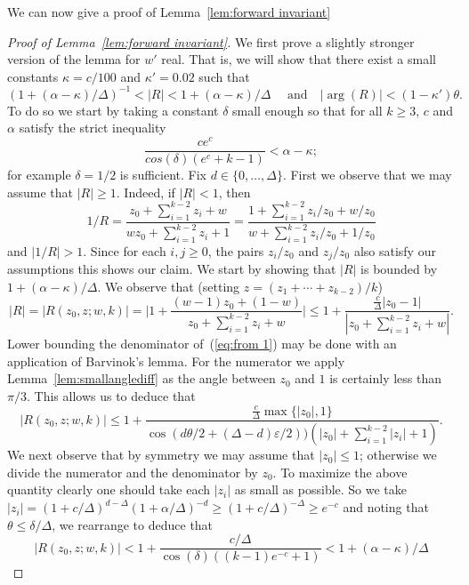 \documentclass[10pt,a4paper]{article}
\theoremstyle{definition}
\newcommand*{\eps}{\varepsilon}
\begin{document}
\noindent
We can now give a proof of Lemma~\ref{lem:forward invariant}
%
\begin{proof}[Proof of Lemma~\ref{lem:forward invariant}]
We first prove a slightly stronger version of the lemma for $w'$ real.
That is, we will show that there exist a small constants $\kappa = c/100$ and $\kappa'=0.02$ such that
\begin{equation}\label{eq:real case}
(1+(\alpha-\kappa)/\Delta)^{-1}<|R|<1+(\alpha-\kappa)/\Delta \quad \text{ and}\quad |\arg(R)|< (1-\kappa')\theta.
\end{equation}
To do so we start by taking a constant $\delta$ small enough so that for all $k \geq 3$, $c$ and $\alpha$ satisfy the strict inequality 
%
\begin{equation}
 \frac{ce^c}{cos(\delta)(e^c+k-1)} < \alpha - \kappa; 
 \label{eq:calphabounds}
\end{equation}
for example $\delta = 1/2$ is sufficient.
%
%
%
Fix $d\in\{0,\ldots,\Delta\}$.
First we observe that we may assume that $|R|\geq 1$. 
Indeed, if $|R|<1$, then 
\[
1/R=\frac{z_0+\sum_{i=1}^{k-2}z_i+w}{wz_0+\sum_{i=1}^{k-2}z_i+1}=\frac{1+\sum_{i=1}^{k-2}z_i/z_0+w/z_0}{w+\sum_{i=1}^{k-2}z_i/z_0+1/z_0}
\]
and $|1/R|>1$.
Since for each $i,j\geq 0$, the pairs $z_i/z_0$ and $z_j/z_0$ also satisfy our assumptions this shows our claim.
We start by showing that $|R|$ is bounded by $1+(\alpha - \kappa)/\Delta$.
%
We observe that (setting $z = (z_1 + \cdots + z_{k-2})/k$)
\begin{equation}\label{eq:from 1}
|R| = |R(z_0,z;w,k)|=\bigg|1+\frac{(w-1)z_0+(1-w)}{z_0+\sum_{i=1}^{k-2}z_i+w}\bigg|\leq 1+\frac{\frac{c}{\Delta}|z_0-1|}{|z_0+\sum_{i=1}^{k-2}z_i+w|}.
\end{equation}
Lower bounding the denominator of~(\ref{eq:from 1}) may be done with an application of Barvinok's lemma.
For the numerator we apply Lemma~\ref{lem:smallanglediff} as the angle between $z_0$ and $1$ is certainly less than $\pi/3$. 
This allows us to deduce that
\[
 |R(z_0,z;w,k)| \leq 1 +\frac{\frac{c}{\Delta} \max\{|z_0|,1\}}{\cos(d\theta/2+(\Delta-d)\eps/2))(|z_0|+\sum_{i=1}^{k-2}|z_i|+1)}.
\]
We next observe that by symmetry we may assume that $|z_0|\leq 1$; otherwise we divide the numerator and the denominator by $z_0$.
To maximize the above quantity clearly one should take each $|z_i|$ as small as possible. 
So we take $|z_i| = (1+c/\Delta)^{d-\Delta}(1+\alpha/\Delta)^{-d} \geq (1+c/\Delta)^{-\Delta} \geq e^{-c}$ and noting that $\theta\leq \delta/\Delta$, we rearrange to deduce that 
\[
|R(z_0,z;w,k)| < 1+\frac{c / \Delta}{\cos(\delta)((k-1)e^{-c}+1)}< 1+(\alpha-\kappa)/\Delta
\]
\end{proof}
\end{document}
